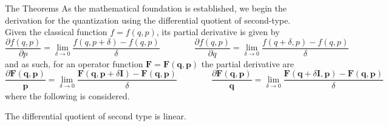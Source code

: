 \documentclass[aspectratio=169]{beamer}
\begin{document}
	\begin{frame}[allowframebreaks]{The Theorems}
		As the mathematical foundation is established, we begin the derivation for the quantization using the differential quotient of second-type. Given the classical function $f=f(q,p)$, its partial derivative is given by
		\begin{equation}
			\frac{\partial f(q,p)}{\partial p}=\lim_{\delta\to0}\frac{f(q,p+\delta)-f(q,p)}{\delta}\qquad\qquad\frac{\partial f(q,p)}{\partial q}=\lim_{\delta\to0}\frac{f(q+\delta,p)-f(q,p)}{\delta}
		\end{equation}
		and as such, for an operator function $\textbf{F}=\textbf{F}(\textbf{q},\textbf{p})$ the partial derivative are
		\begin{equation}
			\frac{\partial\textbf{F}(\textbf{q},\textbf{p})}{\textbf{p}}=\lim_{\delta\to0}\frac{\textbf{F}(\textbf{q},\textbf{p}+\delta\textbf{I})-\textbf{F}(\textbf{q},\textbf{p})}{\delta}\qquad\qquad\frac{\partial\textbf{F}(\textbf{q},\textbf{p})}{\textbf{q}}=\lim_{\delta\to0}\frac{\textbf{F}(\textbf{q}+\delta\textbf{I},\textbf{p})-\textbf{F}(\textbf{q},\textbf{p})}{\delta}
		\end{equation}
		where the following is considered.
		\begin{theorem}
			The differential quotient of second type is linear.
		\end{theorem}
		

\end{frame}
\end{document}

